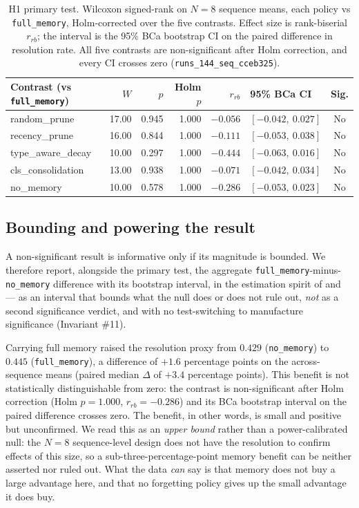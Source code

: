 \begin{table}[htbp]
  \centering
  \caption{H1 primary test. Wilcoxon signed-rank on $N=8$ sequence means, each policy vs
  \texttt{full\_memory}, Holm-corrected over the five contrasts. Effect size is
  rank-biserial $r_{rb}$; the interval is the 95\% BCa bootstrap CI on the paired
  difference in resolution rate. All five contrasts are non-significant after Holm
  correction, and every CI crosses zero (\texttt{runs\_144\_seq\_cceb325}).}
  \label{tab:main-results}
  \begin{tabular}{lrrrrlc}
    \toprule
    Contrast (vs \texttt{full\_memory}) & $W$ & $p$ & Holm $p$ & $r_{rb}$ & 95\% BCa CI & Sig. \\
    \midrule
    random\_prune      & 17.00 & 0.945 & 1.000 & $-0.056$ & $[-0.042,\ 0.027]$ & No \\
    recency\_prune     & 16.00 & 0.844 & 1.000 & $-0.111$ & $[-0.053,\ 0.038]$ & No \\
    type\_aware\_decay & 10.00 & 0.297 & 1.000 & $-0.444$ & $[-0.063,\ 0.016]$ & No \\
    cls\_consolidation & 13.00 & 0.938 & 1.000 & $-0.071$ & $[-0.042,\ 0.034]$ & No \\
    no\_memory         & 10.00 & 0.578 & 1.000 & $-0.286$ & $[-0.053,\ 0.023]$ & No \\
    \bottomrule
  \end{tabular}
\end{table}

\subsection{Bounding and powering the result}

A non-significant result is informative only if its magnitude is bounded. We therefore
report, alongside the primary test, the aggregate \texttt{full\_memory}-minus-\texttt{no\_memory}
difference with its bootstrap interval, in the estimation spirit of \cite{cumming2014} and
\cite{wasserstein2019} --- as an interval that bounds what the null does or does not rule
out, \emph{not} as a second significance verdict, and with no test-switching to manufacture
significance (Invariant \#11).

Carrying full memory raised the resolution proxy from $0.429$ (\texttt{no\_memory}) to
$0.445$ (\texttt{full\_memory}), a difference of $+1.6$ percentage points on the
across-sequence means (paired median $\Delta$ of $+3.4$ percentage points). This benefit is
not statistically distinguishable from zero: the contrast is non-significant after Holm
correction (Holm $p = 1.000$, $r_{rb} = -0.286$) and its BCa bootstrap interval on the
paired difference crosses zero. The benefit, in other words, is small and positive but
unconfirmed. We read this as an \emph{upper bound} rather than a power-calibrated null: the
$N=8$ sequence-level design does not have the resolution to confirm effects of this size,
so a sub-three-percentage-point memory benefit can be neither asserted nor ruled out. What
the data \emph{can} say is that memory does not buy a large advantage here, and that no
forgetting policy gives up the small advantage it does buy.

